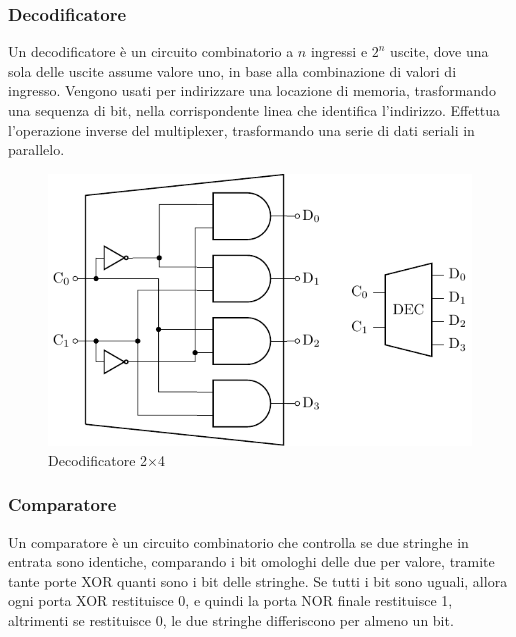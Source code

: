 \documentclass{article}
\numberwithin{equation}{subsection}
\begin{document}
\subsubsection{Decodificatore}

Un decodificatore è un circuito combinatorio a $n$ ingressi e $2^n$ uscite, dove una sola delle uscite assume valore uno, in base alla combinazione di valori di ingresso. Vengono usati per indirizzare una 
locazione di memoria, trasformando una sequenza di bit, nella corrispondente linea che identifica l'indirizzo. Effettua l'operazione inverse del multiplexer, trasformando una serie di dati seriali in parallelo. 

\begin{figure}[H]%
    \centering%
    \includegraphics{decodificatore-2x4.pdf}%
    \caption{Decodificatore 2$\times$4}%
\end{figure}

\subsubsection{Comparatore}

Un comparatore è un circuito combinatorio che controlla se due stringhe in entrata sono identiche, comparando i bit omologhi delle due per valore, tramite tante porte XOR quanti sono i bit delle stringhe. Se tutti 
i bit sono uguali, allora ogni porta XOR restituisce 0, e quindi la porta NOR finale restituisce 1, altrimenti se restituisce 0, le due stringhe differiscono per almeno un bit. 
\end{document}

